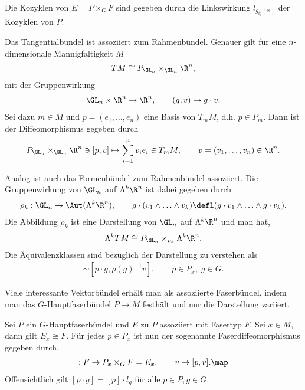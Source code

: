 \documentclass[%
	paper=a5,%
	fleqn,%
	DIV=18,%
	BCOR=0mm,
	fontsize=11pt,
	titlepage=false,%
	bibliography=totoc,
	DIV=18,%
	twoside=true,
	pdftitle=Riemannsche Geometrie,
	pdfauthor=Uwe Semmelmann,
	numbers=noendperiod]%
	{scrbook}
\begin{document}
\begin{rem}
Die Kozyklen von $E = P \times_G F$ sind gegeben durch die Linkswirkung
$l_{g_{ij}(x)}$ der Kozyklen von $P$.\map
\end{rem}

\begin{ex}
\begin{exenum}
\item 
Das Tangentialbündel ist assoziiert zum Rahmenbündel. Genauer gilt
für eine $n$-dimensionale Mannigfaltigkeit $M$
\begin{align*}
TM \cong
P_{\GL_n}\times_{\GL_n} \R^n,
\end{align*}
mit der Gruppenwirkung
\begin{align*}
\GL_n \times\R^n\to \R^n,\qquad (g,v)\mapsto g\cdot v.
\end{align*}
Sei dazu $m\in M$ und $p=(e_1,\ldots,e_n)$ eine Basis von $T_mM$, d.h. $p\in
P_m$. Dann ist der Diffeomorphismus gegeben durch
\begin{align*}
P_{\GL_n}\times_{\GL_n}\R^n \ni [p,v] \mapsto \sum_{i=1}^n v_i e_i \in
T_mM,\qquad
v = (v_1, \ldots, v_n)\in\R^n.
\end{align*}
\item 
Analog ist auch das Formenbündel zum Rahmenbündel assoziiert.
Die Gruppenwirkung von $\GL_n$ auf $\Lambda^k \R^n$ ist dabei gegeben durch
\begin{align*}
\rho_k : \GL_n\to \Aut(\Lambda^k \R^n),\qquad
g\cdot (v_1\wedge \ldots\wedge v_k)
\defl (g\cdot v_1\wedge \ldots \wedge g\cdot v_k).
\end{align*}
Die Abbildung $\rho_k$ ist eine Darstellung von $\GL_n$ auf $\Lambda^k \R^n$ und man hat,
\begin{align*}
\Lambda^k TM \cong P_{\GL_n} \times_{\rho_k} \Lambda^k \R^n.
\end{align*}
Die Äquivalenzklassen sind bezüglich der Darstellung zu verstehen als
\begin{align*}
[p,v] \sim [p\cdot g,\rho(g)^{-1}v],\qquad p\in P_x,\; g\in G.
\end{align*}
\item
Viele interessante Vektorbündel erhält man als assoziierte Faserbündel, indem
man das $G$-Hauptfaserbündel $P\to M$ festhält und nur die Darstellung
variiert.~\boxc
\end{exenum}
\end{ex}

\begin{rem}
Sei $P$ ein $G$-Hauptfaserbündel und $E$ zu $P$ assoziiert mit Fasertyp $F$. Sei
$x\in M$, dann gilt $E_x\cong F$. Für jedes $p\in P_x$ 
ist nun der sogenannte Faserdiffeomorphismus gegeben durch,
\begin{align*}
[p] : F\to P_x\times_G F = E_x,\qquad
v\mapsto [p,v].\map
\end{align*}
Offensichtlich gilt $[p \cdot g] = [p] \cdot l_g$ für alle $p\in P, g\in G$.
\end{rem}
\end{document}
